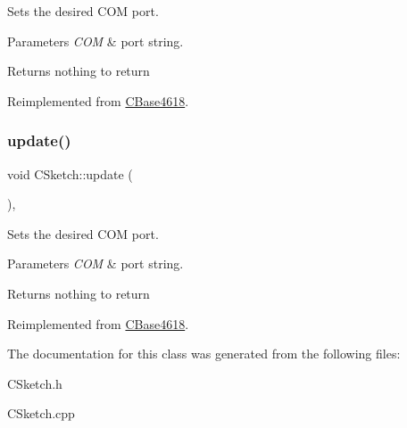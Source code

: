 Sets the desired C\+OM port. 


\begin{DoxyParams}{Parameters}
{\em C\+OM} & port string. \\
\hline
\end{DoxyParams}
\begin{DoxyReturn}{Returns}
nothing to return 
\end{DoxyReturn}


Reimplemented from \hyperlink{class_c_base4618_a853327d563d064bb31db241861c4d291}{C\+Base4618}.

\hypertarget{class_c_sketch_a8b6185fa49d7f9d8909dcffde3cdec3d}{}\label{class_c_sketch_a8b6185fa49d7f9d8909dcffde3cdec3d} 
\subsubsection{\texorpdfstring{update()}{update()}}
{\footnotesize\ttfamily void C\+Sketch\+::update (\begin{DoxyParamCaption}{ }\end{DoxyParamCaption})\hspace{0.3cm}{\ttfamily [override]}, {\ttfamily [virtual]}}



Sets the desired C\+OM port. 


\begin{DoxyParams}{Parameters}
{\em C\+OM} & port string. \\
\hline
\end{DoxyParams}
\begin{DoxyReturn}{Returns}
nothing to return 
\end{DoxyReturn}


Reimplemented from \hyperlink{class_c_base4618_ae1ac81eaa56ded6600262c361f723cb8}{C\+Base4618}.



The documentation for this class was generated from the following files\+:\begin{DoxyCompactItemize}
\item 
C\+Sketch.\+h\item 
C\+Sketch.\+cpp\end{DoxyCompactItemize}
